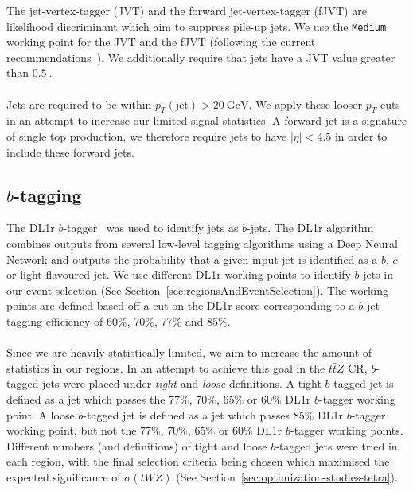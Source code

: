 The jet-vertex-tagger (JVT) and the forward jet-vertex-tagger (fJVT) are likelihood discriminant which aim to suppress pile-up jets. We use the \texttt{Medium} working point for the JVT and the fJVT (following the current recommendations~\cite{JVTandfJVT-Recommendations}). We additionally require that jets have a JVT value greater than $\SI{0.5}{}$.\\\\
 
Jets are required to be within $p_{T}(\text{jet}) > \SI{20}{\GeV}$. We apply these looser $p_T$ cuts in an attempt to increase our limited signal statistics. A forward jet is a signature of single top production, we therefore require jets to have $|\eta| < 4.5$ in order to include these forward jets.



\subsection{$b$-tagging}
The DL1r $b$-tagger~\cite{DL1r-paper} was used to identify jets as $b$-jets. The DL1r algorithm combines outputs from several low-level tagging algorithms using a Deep Neural Network and outputs the probability that a given input jet is identified as a $b$, $c$ or light flavoured jet. We use different DL1r working points to identify $b$-jets in our event selection (See Section~\ref{sec:regionsAndEventSelection}). The working points are defined based off a cut on the DL1r score corresponding to a $b$-jet tagging efficiency of 60$\%$, 70$\%$, 77$\%$ and 85$\%$. \\\\
Since we are heavily statistically limited, we aim to increase the amount of statistics in our regions. In an attempt to achieve this goal in the $t\bar{t}Z$ CR, $b$-tagged jets were placed under \textit{tight} and \textit{loose} definitions. A tight $b$-tagged jet is defined as a jet which passes the 77$\%$, 70$\%$, 65$\%$ or 60$\%$ DL1r $b$-tagger working point. A loose $b$-tagged jet is defined as a jet which passes 85$\%$ DL1r $b$-tagger working point, but not the 77$\%$, 70$\%$, 65$\%$ or 60$\%$ DL1r $b$-tagger working points. Different numbers (and definitions) of tight and loose $b$-tagged jets were tried in each region, with the final selection criteria being chosen which maximised the expected significance of $\sigma(tWZ)$ (See Section~\ref{sec:optimization-studies-tetra}).





